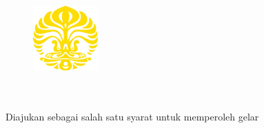 %
%
%

\begin{titlepage}
	\begin{singlespace*}
	    \begin{center}
	    	\begin{figure}
	            \begin{center}
	                \includegraphics[width=2.5cm]{assets/pics/makara_kuning.png}
	            \end{center}
	        \end{figure}
	        \vspace*{-0.25cm}
	        \large
	
	        \vspace*{1.0cm}
	        \large
	        \bo{\Judul} \\[1.0cm]
	
	        \vspace*{2.5 cm}
	        \large
	        \bo{\Type} \\[0.5cm]
	        \normalsize
	        Diajukan sebagai salah satu syarat untuk memperoleh gelar \\
	        \gelar\\
	
	        \vspace*{4 cm}
	        
	        \large
	        \ifx\blank\npmDua
		        \bo{\PenulisSatu} \\
		        \bo{\npmSatu} \\
		    \else
		    	\bo{\PenulisSatu~/ \npmSatu~/ \ProgramSatu}\\
		    	\bo{\PenulisDua~/ \npmDua~/ \ProgramDua}\\
		    \fi
		    \ifx\blank\npmTiga\else
			    \bo{\PenulisTiga~/ \npmTiga~/ \ProgramTiga}\\
		    \fi
		    
	        \vspace*{4.75 cm}
	
	        \large
	        \normalsize
	    \end{center}
	\end{singlespace*}
\end{titlepage}
